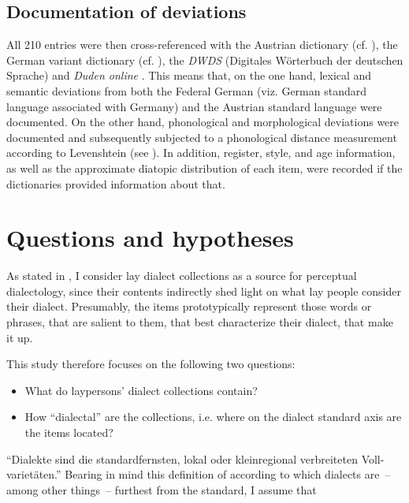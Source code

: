 \documentclass[output=paper]{langscibook}
\begin{document}
\subsection{Documentation of deviations}
\label{sec:kathrein:3.3}
All 210 entries were then cross-referenced with the Austrian dictionary (cf. \citealt{PabstEybl2018}), the German variant dictionary (cf. \citealt{AmmonEtAl2016}), the \textit{DWDS} (Digitales Wörterbuch der deutschen Sprache) and \textit{Duden online} \citep{DudenOnline}. This means that, on the one hand, lexical and semantic deviations from both the Federal German (viz. German standard language associated with Germany) and the Austrian standard language were documented. On the other hand, phonological and morphological deviations were documented and subsequently subjected to a phonological distance measurement according to Levenshtein (see ). In addition, register, style, and age information, as well as the approximate diatopic distribution of each item, were recorded if the dictionaries provided information about that.

\section{Questions and hypotheses}
\label{sec:kathrein:3.4}
As stated in , I consider lay dialect collections as a source for perceptual dialectology, since their contents indirectly shed light on what lay people consider their dialect. Presumably, the items prototypically represent those words or phrases, that are salient to them, that best characterize their dialect, that make it up.

This study therefore focuses on the following two questions: 

\begin{itemize}
\item What do laypersons’ dialect collections contain? 
\item How “dialectal” are the collections, i.e. where on the dialect standard axis are the items located? 
\end{itemize}

\begin{sloppypar}
“Dialekte sind die standardfernsten, lokal oder kleinregional verbreiteten Voll-varietäten.” \citep[59]{SchmidtHerrgen2011} Bearing in mind this definition of \citet{SchmidtHerrgen2011} according to which dialects are~– among other things~– furthest from the standard, I assume that 
\end{sloppypar}
\end{document}
